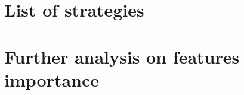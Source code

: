 \documentclass[11pt, twoside, a4paper]{book}
\theoremstyle{definition}
\begin{document}

\restoregeometry

\frontmatter
\pagestyle{chapterstyle} %




\tableofcontents
\listoffigures
\listoftables
\listofalgorithms

\mainmatter
\pagestyle{normal} %
















\begin{appendices}


\chapter{List of strategies}




\chapter{Further analysis on features importance}





\end{appendices}
\end{document}

